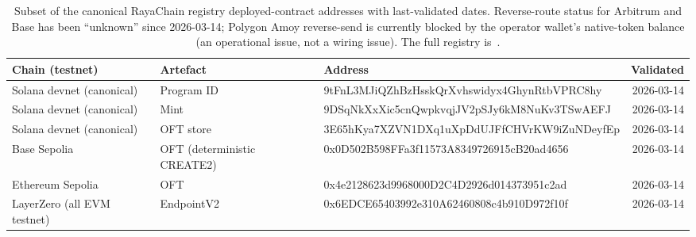 \documentclass[11pt,a4paper]{article}
\providecommand{\seqsplit}[1]{#1}
\begin{document}
\begin{table}[h]
\centering
\footnotesize
\setlength{\tabcolsep}{4pt}
\renewcommand{\arraystretch}{1.15}
\begin{tabularx}{\linewidth}{@{}l l X r@{}}
\toprule
\textbf{Chain (testnet)} & \textbf{Artefact} & \textbf{Address} & \textbf{Validated} \\
\midrule
Solana devnet (canonical) & Program ID & \seqsplit{9tFnL3MJiQZhBzHsskQrXvhswidyx4GhynRtbVPRC8hy} & 2026-03-14 \\
Solana devnet (canonical) & Mint        & \seqsplit{9DSqNkXxXic5cnQwpkvqjJV2pSJy6kM8NuKv3TSwAEFJ} & 2026-03-14 \\
Solana devnet (canonical) & OFT store   & \seqsplit{3E65hKya7XZVN1DXq1uXpDdUJFfCHVrKW9iZuNDeyfEp} & 2026-03-14 \\
\addlinespace[2pt]
Base Sepolia              & OFT (deterministic CREATE2) & \seqsplit{0x0D502B598FFa3f11573A8349726915cB20ad4656} & 2026-03-14 \\
Ethereum Sepolia          & OFT                          & \seqsplit{0x4e2128623d9968000D2C4D2926d014373951c2ad} & 2026-03-14 \\
LayerZero (all EVM testnet) & EndpointV2                  & \seqsplit{0x6EDCE65403992e310A62460808c4b910D972f10f} & 2026-03-14 \\
\bottomrule
\end{tabularx}
\caption{Subset of the canonical RayaChain registry deployed-contract addresses
with last-validated dates. Reverse-route status for Arbitrum and Base has been
``unknown'' since 2026-03-14; Polygon Amoy reverse-send is currently blocked by
the operator wallet's native-token balance (an operational issue, not a wiring
issue). The full registry is~\cite{rayachain2026registry}.}
\label{tab:rayachain-registry}
\end{table}
\end{document}
